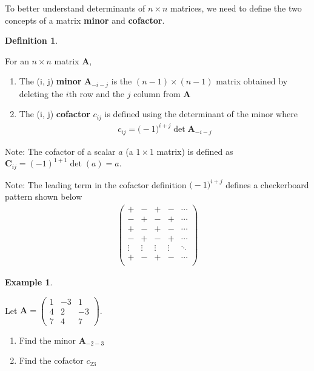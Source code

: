\documentclass[
]{book}
\theoremstyle{definition}
\newtheorem{definition}{Definition}[chapter]
\theoremstyle{definition}
\newtheorem{example}{Example}[chapter]
\theoremstyle{definition}
\theoremstyle{remark}
\begin{document}
To better understand determinants of \(n \times n\) matrices, we need to define the two concepts of a matrix \textbf{minor} and \textbf{cofactor}.

\begin{definition}
\protect\hypertarget{def:minor-cofactor}{}\label{def:minor-cofactor}

For an \(n \times n\) matrix \(\mathbf{A}\),

\begin{enumerate}
\def\labelenumi{\alph{enumi})}
\item
  The (i, j) \textbf{minor} \(\mathbf{A}_{-i-j}\) is the \((n-1) \times (n-1)\) matrix obtained by deleting the \(i\)th row and the \(j\) column from \(\mathbf{A}\)
\item
  The (i, j) \textbf{cofactor} \(c_{ij}\) is defined using the determinant of the minor where
  \[
  \begin{aligned}
  c_{ij} = \mathbf(-1)^{i + j} \det{\mathbf{A}_{-i-j}}
  \end{aligned}
  \]
\end{enumerate}

\end{definition}

Note: The cofactor of a scalar \(a\) (a \(1 \times 1\) matrix) is defined as \(\mathbf{C}_{ij} = (-1)^{1 + 1} \det(a) = a\).

Note: The leading term in the cofactor definition \(\mathbf(-1)^{i + j}\) defines a checkerboard pattern shown below
\[
\begin{aligned}
\begin{pmatrix}
+ & - & + & - & \cdots \\
- & + & - & + & \cdots \\
+ & - & + & - & \cdots \\
- & + & - & + & \cdots \\
\vdots & \vdots & \vdots & \vdots & \ddots \\
+ & - & + & - & \cdots \\
\end{pmatrix}
\end{aligned}
\]

\begin{example}
\protect\hypertarget{exm:unlabeled-div-102}{}\label{exm:unlabeled-div-102}

Let \(\mathbf{A} = \begin{pmatrix} 1 & -3 & 1 \\ 4 & 2 & -3 \\ 7 & 4 & 7 \end{pmatrix}\).

\begin{enumerate}
\def\labelenumi{\alph{enumi})}
\item
  Find the minor \(\mathbf{A}_{-2-3}\)
\item
  Find the cofactor \(c_{23}\)
\end{enumerate}

\end{example}
\end{document}

